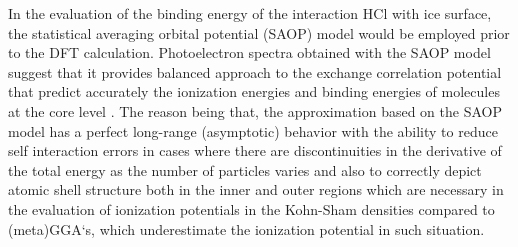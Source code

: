 \documentclass[a4paper,11pt]{report}
\begin{document}
In the evaluation of the binding energy of the interaction HCl with ice surface, the statistical averaging orbital potential (SAOP) model \citep{schipper2000molecular} would be employed prior to the DFT calculation. Photoelectron spectra obtained with the SAOP model suggest that it provides balanced approach to the exchange correlation potential that predict accurately the ionization energies \citep{lemierre2005calculation, segala2009evaluation} and binding energies of molecules at the core level \citep{takahata2003dft}. The reason being that, the approximation based on the SAOP model has a perfect long-range (asymptotic) behavior with the ability to reduce self interaction errors in cases where there are discontinuities in the derivative of the total energy as the  number of particles varies and also to correctly depict atomic shell structure both in the inner and outer regions which are necessary in the evaluation of ionization potentials in the Kohn-Sham densities\citep{tecmer2011electronic} compared to (meta)GGA`s, which underestimate the ionization potential in such situation. 
\end{document}
